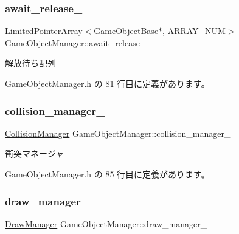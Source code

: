 \subsubsection{\texorpdfstring{await\+\_\+release\+\_\+}{await\_release\_}}
{\footnotesize\ttfamily \mbox{\hyperlink{class_limited_pointer_array}{Limited\+Pointer\+Array}}$<$\mbox{\hyperlink{class_game_object_base}{Game\+Object\+Base}}$\ast$, \mbox{\hyperlink{class_game_object_manager_a591934d64d750c10c03c908371470681}{A\+R\+R\+A\+Y\+\_\+\+N\+UM}}$>$ Game\+Object\+Manager\+::await\+\_\+release\+\_\+\hspace{0.3cm}{\ttfamily [private]}}



解放待ち配列 



 Game\+Object\+Manager.\+h の 81 行目に定義があります。

\mbox{\label{class_game_object_manager_a3a173415abbd4acbe2abaf40e0a6c1b8}} 
\subsubsection{\texorpdfstring{collision\+\_\+manager\+\_\+}{collision\_manager\_}}
{\footnotesize\ttfamily \mbox{\hyperlink{class_collision_manager}{Collision\+Manager}} Game\+Object\+Manager\+::collision\+\_\+manager\+\_\+\hspace{0.3cm}{\ttfamily [private]}}



衝突マネージャ 



 Game\+Object\+Manager.\+h の 85 行目に定義があります。

\mbox{\label{class_game_object_manager_afad3b0a750982e55d71edd72b440c724}} 
\subsubsection{\texorpdfstring{draw\+\_\+manager\+\_\+}{draw\_manager\_}}
{\footnotesize\ttfamily \mbox{\hyperlink{class_draw_manager}{Draw\+Manager}} Game\+Object\+Manager\+::draw\+\_\+manager\+\_\+\hspace{0.3cm}{\ttfamily [private]}}



